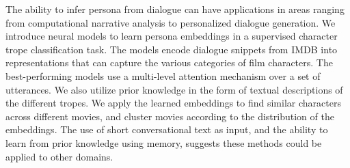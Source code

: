 The ability to infer persona from dialogue can have applications in areas ranging from computational narrative analysis to personalized dialogue generation. We introduce neural models to learn persona embeddings in a supervised character trope classification task. The models encode dialogue snippets from IMDB into representations that can capture the various categories of film characters.  The best-performing models use a multi-level attention mechanism over a set of utterances. We also utilize prior knowledge in the form of textual descriptions of the different tropes. We apply the learned embeddings to find similar characters across different movies, and cluster movies according to the distribution of the embeddings. The use of short conversational text as input, and the ability to learn from prior knowledge using memory, suggests these methods could be applied to other domains.
